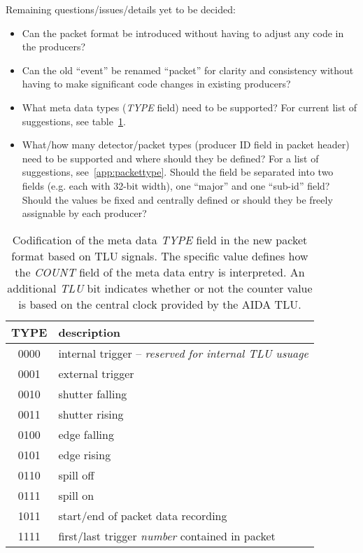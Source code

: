 \documentclass[paper=a4, fontsize=11pt]{scrartcl}	%
\numberwithin{equation}{section}		%
\numberwithin{figure}{section}			%
\numberwithin{table}{section}           	%
\begin{document}
Remaining questions/issues/details yet to be decided:
\begin{itemize}
\item Can the packet format be introduced without having to adjust any
  code in the producers?
\item Can the old ``event'' be renamed ``packet'' for clarity and
  consistency without having to make significant code changes in
  existing producers?
\item What meta data types (\emph{TYPE} field) need to be supported?
  For current list of suggestions, see table~\ref{tab:typefield}.
\item What/how many detector/packet types (producer ID field in packet
  header) need to be supported and where should they be defined? For a list of suggestions,
  see~\ref{app:packettype}. Should the field be separated into two
  fields (e.g. each with 32-bit width), one ``major'' and one
  ``sub-id'' field? Should the values be fixed and centrally defined
  or should they be freely assignable by each producer?
\end{itemize}

  \begin{table}[htbp]
    \centering
    \begin{tabular}{cl}
    \toprule
    \textbf{TYPE} & \textbf{description} \\
    \midrule
    0000 &  internal trigger -- \emph{reserved for internal TLU usuage}\\
    0001 &  external trigger\\
    0010 &  shutter falling \\
    0011 &  shutter rising  \\
    0100 &  edge falling    \\
    0101 &  edge rising     \\
    0110 &  spill off       \\
    0111 &  spill on        \\
    1011 & start/end of packet data recording \\
    1111 & first/last trigger \emph{number} contained in packet \\
    \bottomrule
  \end{tabular}
  \caption{Codification of the meta data \emph{TYPE} field in the new
    packet format based on TLU signals\cite{tlu2014}. The specific
    value defines how the \emph{COUNT} field of the meta data entry is
    interpreted. An additional \emph{TLU} bit indicates whether or not the counter value
    is based on the central clock provided by the AIDA TLU.}
\label{tab:typefield}
\end{table}
\end{document}
